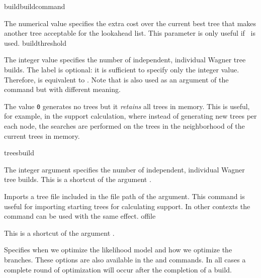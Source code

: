 \begin{command}{build}{buildcommand}
\begin{arguments}
            {The numerical value specifies the extra cost over the current best
            tree that makes another tree acceptable for the lookahead list. This 
            parameter is only useful if~ is used.}
            {buildthreshold}
            
            {The integer value specifies the number of independent, individual
            Wagner tree builds. The label  is optional: it is
            sufficient to specify only the integer value. Therefore,  is
            equivalent to .  Note that   is
            also used as an argument of the command 
            but with different meaning.
            
            The value \texttt{0} generates no trees but it \emph{retains} all trees in memory.
            This is useful, for example, in the  support calculation,
            where instead of generating new trees per each node, the searches are
            performed on the trees in the neighborhood of the current trees in memory.}
            {treesbuild}

            {The integer argument specifies the number of independent, individual
            Wagner tree builds. This is a shortcut of the argument .}
            {}

            {Imports a tree file included in the file path of the argument. This command is
            useful for importing starting trees for calculating  support.
            In other contexts the command  can be used with the same effect.}
            {offile}

            {This is a shortcut of the argument .}
            {}

            {Specifies when we optimize the likelihood model and how we optimize
            the branches. These options are also available in the
             and  commands. In all cases a
            complete round of optimization will occur after the completion of a
            build.

}
\end{arguments}
\end{command}
